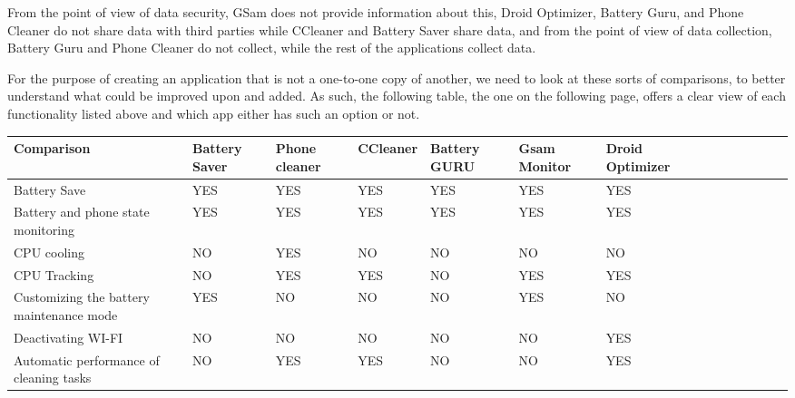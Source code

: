     From the point of view of data security, GSam does not provide information about this, Droid Optimizer, Battery Guru, and Phone Cleaner do not share data with third parties while CCleaner and Battery Saver share data, and from the point of view of data collection, Battery Guru and Phone Cleaner do not collect, while the rest of the applications collect data. 

    For the purpose of creating an application that is not a one-to-one copy of another, we need to look at these sorts of comparisons, to better understand what could be improved upon and added. As such, the following table, the one on the following page, offers a clear view of each functionality listed above and which app either has such an option or not.

    \begin{center}
    \begin{tabular}{ | >{\centering\arraybackslash}X m{3cm} | >{\centering\arraybackslash}X m{1.6cm} | >{\centering\arraybackslash}X m{1.6cm} | >{\centering\arraybackslash}X m{1.8cm} | >{\centering\arraybackslash}X m{1.7cm} | >{\centering\arraybackslash}X m{1.7cm} | >{\centering\arraybackslash}X m{2cm} | }
    \hline
        \textbf{Comparison} & \textbf{Battery Saver} & \textbf{Phone cleaner} & \textbf{CCleaner} & \textbf{Battery GURU} & \textbf{Gsam Monitor} & \textbf{Droid Optimizer} \\ \hline
        
        Battery Save & YES & YES & YES & YES & YES & YES \\ \hline
        
        Battery and phone state monitoring & YES & YES & YES & YES & YES & YES \\ \hline
        
        CPU cooling & NO & YES & NO & NO & NO & NO \\ \hline
        
        CPU Tracking & NO & YES & YES & NO & YES & YES \\ \hline
        
        Customizing the battery maintenance mode & YES & NO & NO & NO & YES & NO \\ \hline
        
        Deactivating WI-FI & NO & NO & NO & NO & NO & YES \\ \hline
        
        Automatic performance of cleaning tasks & NO & YES & YES & NO & NO & YES \\ \hline
        

\end{tabular}
\end{center}
